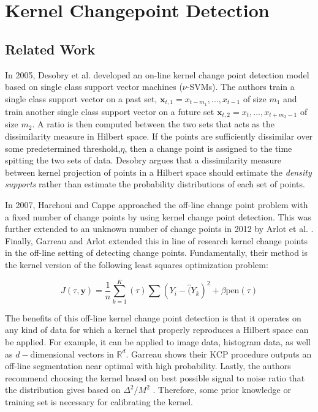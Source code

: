 \chapter{Kernel Changepoint Detection}

\section{Related Work}

In 2005, Desobry et al. \cite{desobry2005online} developed an on-line kernel change point detection model based on single class support vector machines ($\nu$-SVMs). The authors train a single class support vector on a past set, $\mathbf{x}_{t,1}={x_{t-m_1},...,x_{t-1}}$ of size $m_1$ and train another single class support vector on a future set $\mathbf{x}_{t,2}={x_t,...,x_{t+m_2-1}}$ of size $m_2$. A ratio is then computed between the two sets that acts as the dissimilarity measure in Hilbert space. If the points are sufficiently dissimilar over some predetermined threshold,$\eta$, then a change point is assigned to the time spitting the two sets of data. Desobry argues that a dissimilarity measure between kernel projection of points in a Hilbert space should estimate the \textit{density supports} rather than estimate the probability distributions of each set of points. 

In 2007, Harchoui and Cappe \cite{harchaoui2007retrospective} approached the off-line change point problem with a fixed number of change points by using kernel change point detection. This was further extended to an unknown number of change points in 2012 by Arlot et al. \cite{arlot2012kernel}. Finally, Garreau and Arlot extended this in line of research kernel change points in the off-line setting of detecting change points. Fundamentally, their method is the kernel version of the following least squares optimization problem:

\begin{equation}
J(\tau, \mathbf{y}) = \frac{1}{n} \sum_{k=1}^K(\tau) \sum (Y_i - \hat(Y_k)^2 + \beta \text{pen}(\tau)
\end{equation}


The benefits of this off-line kernel change point detection is that it operates on any kind of data for which a kernel that properly reproduces a Hilbert space can be applied. For example, it can be applied to image data, histogram data, as well as $d-$dimensional vectors in $\mathbb{R}^d$. Garreau shows their KCP procedure outputs an off-line segmentation near optimal with high probability. Lastly, the authors recommend choosing the kernel based on best possible signal to noise ratio that the distribution gives based on $ \Delta^2 / M^2$ . Therefore, some prior knowledge or training set is necessary for calibrating the kernel. 

